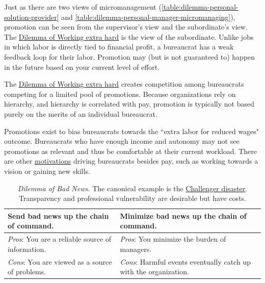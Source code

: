Just as there are two views of micromanagement (\ref{table:dilemma-personal-solution-provider} and \ref{table:dilemma-personal-manager-micromanaging}), promotion can be seen from the supervisor's view and the subordinate's view. The \hyperref[table:dilemma-personal-work-extra-or-work-as-expected]{Dilemma of Working extra hard} is the view of the subordinate. Unlike jobs in which labor is directly tied to financial profit, a bureaucrat has a weak feedback loop for their labor. Promotion may (but is not guaranteed to) happen in the future based on your current level of effort. 

The \hyperref[table:dilemma-personal-work-extra-or-work-as-expected]{Dilemma of Working extra hard} creates competition among bureaucrats competing for a limited pool of promotions. Because organizations rely on hierarchy, and hierarchy is correlated with pay, promotion is typically not based purely on the merits of an individual bureaucrat. 

Promotions exist to bias bureaucrats towards the ``extra labor for reduced wages" outcome. Bureaucrats who have enough income and autonomy may not see promotions as relevant and thus be comfortable at their current workload. There are other 
\hyperref[sec:motivations]{motivations} 
driving bureaucrats besides pay, such as working towards a vision or gaining new skills. 

\begin{center}
\begin{table}[H] %
\begin{tabular}{ | m{\dilemmatablewidth}| m{\dilemmatablewidth} | } 
  \hline
  \textbf{Send bad news up the chain of command.} &
  \textbf{Minimize bad news up the chain of command.} \\
  \hline
  \textit{Pros}: You are a reliable source of information. &
  \textit{Pros}: You minimize the burden of managers. \\
  \hline
  \textit{Cons}: You are viewed as a source of problems. & 
  \textit{Cons}: Harmful events eventually catch up with the organization.  \\
  \hline
\end{tabular}
\caption{\textit{Dilemma of Bad News.}
The canonical example is the \href{https://en.wikipedia.org/wiki/Space_Shuttle_Challenger_disaster}{Challenger disaster}. 
Transparency and professional vulnerability are desirable but have costs.}
\label{table:dilemma-personal-bad-news-up-the-chain}
\end{table}
\end{center}

